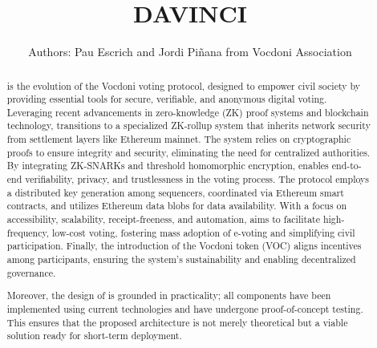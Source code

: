 \documentclass[runningheads, draft]{llncs}
\title{\textsc{DAVINCI}\vspace{-0.4cm}}
\author{Authors: Pau Escrich and Jordi Piñana from Vocdoni Association}
\institute{Last update: \today}
\begin{document}
	
\maketitle

\pagestyle{plain}
\thispagestyle{plain}

\begin{abstract}
		\Davinci is the evolution of the Vocdoni voting protocol, designed to empower civil society by providing essential tools for secure, verifiable, and anonymous digital voting. Leveraging recent advancements in zero-knowledge (ZK) proof systems and blockchain technology, \davinci transitions to a specialized ZK-rollup system that inherits network security from settlement layers like Ethereum mainnet. The system relies on cryptographic proofs to ensure integrity and security, eliminating the need for centralized authorities. By integrating ZK-SNARKs and threshold homomorphic encryption, \davinci enables end-to-end verifiability, privacy, and trustlessness in the voting process. The protocol employs a distributed key generation among sequencers, coordinated via Ethereum smart contracts, and utilizes Ethereum data blobs for data availability. With a focus on accessibility, scalability, receipt-freeness, and automation, \davinci aims to facilitate high-frequency, low-cost voting, fostering mass adoption of e-voting and simplifying civil participation. Finally, the introduction of the Vocdoni token (VOC) aligns incentives among participants, ensuring the system's sustainability and enabling decentralized governance.
		
		Moreover, the design of \davinci is grounded in practicality; all components have been implemented using current technologies and have undergone proof-of-concept testing. This ensures that the proposed architecture is not merely theoretical but a viable solution ready for short-term deployment.
		
\end{abstract}


\end{document}
